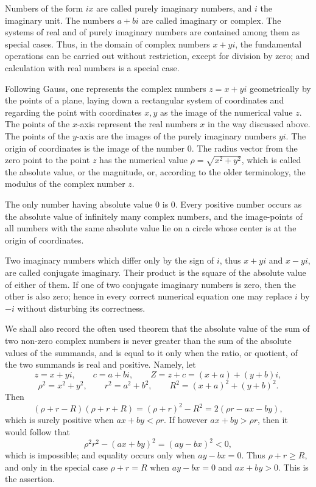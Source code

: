 \documentclass[11pt]{article}
\begin{document}
Numbers of the form $ix$ are called purely imaginary numbers, and $i$ the imaginary unit. The numbers $a+bi$ are called imaginary or complex. The systems of real and of purely imaginary numbers are contained among them as special cases. Thus, in the domain of complex numbers $x+yi$, the fundamental operations can be carried out without restriction, except for division by zero; and calculation with real numbers is a special case.

Following Gauss, one represents the complex numbers $z=x+yi$ geometrically by the points of a plane, laying down a rectangular system of coordinates and regarding the point with coordinates $x,y$ as the image of the numerical value $z$. The points of the $x$-axis represent the real numbers $x$ in the way discussed above. The points of the $y$-axis are the images of the purely imaginary numbers $yi$. The origin of coordinates is the image of the number $0$. The radius vector from the zero point to the point $z$ has the numerical value $\rho=\sqrt{x^2+y^2}$, which is called the absolute value, or the magnitude, or, according to the older terminology, the modulus of the complex number $z$.

The only number having absolute value $0$ is $0$. Every positive number occurs as the absolute value of infinitely many complex numbers, and the image-points of all numbers with the same absolute value lie on a circle whose center is at the origin of coordinates.

Two imaginary numbers which differ only by the sign of $i$, thus $x+yi$ and $x-yi$, are called conjugate imaginary. Their product is the square of the absolute value of either of them. If one of two conjugate imaginary numbers is zero, then the other is also zero; hence in every correct numerical equation one may replace $i$ by $-i$ without disturbing its correctness.

We shall also record the often used theorem that the absolute value of the sum of two non-zero complex numbers is never greater than the sum of the absolute values of the summands, and is equal to it only when the ratio, or quotient, of the two summands is real and positive. Namely, let
\[
 z=x+yi,
 \qquad c=a+bi,
 \qquad Z=z+c=(x+a)+(y+b)i,
\]
\[
 \rho^2=x^2+y^2,
 \qquad r^2=a^2+b^2,
 \qquad R^2=(x+a)^2+(y+b)^2.
\]
Then
\[
 (\rho+r-R)(\rho+r+R)=(\rho+r)^2-R^2=2(\rho r-ax-by),
\]
which is surely positive when $ax+by<\rho r$. If however $ax+by>\rho r$, then it would follow that
\[
 \rho^2r^2-(ax+by)^2=(ay-bx)^2<0,
\]
which is impossible; and equality occurs only when $ay-bx=0$. Thus $\rho+r\ge R$, and only in the special case $\rho+r=R$ when $ay-bx=0$ and $ax+by>0$. This is the assertion.
\end{document}
